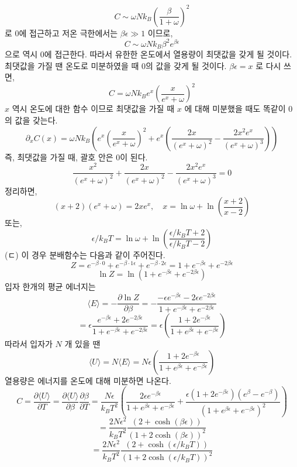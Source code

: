 \documentclass[a4paper,12pt]{report}
\begin{document}
	$$C\sim\omega Nk_B\left(\frac{\beta}{1+\omega} \right)^2 $$
	로 0에 접근하고 저온 극한에서는 $\beta \epsilon\gg 1$ 이므로,
	$$C\sim\omega Nk_B\beta^2e^{\beta\epsilon}$$
	으로 역시 0에 접근한다. 따라서 유한한 온도에서 열용량이 최댓값을 갖게 될 것이다. 최댓값을 가질 땐 온도로 미분하였을 때 0의 값을 갖게 될 것이다. $\beta\epsilon=x$ 로 다시 쓰면,
	$$C=\omega Nk_B e^{x}\left(\frac{x}{e^x+\omega} \right)^2 $$ 
	$x$ 역시 온도에 대한 함수 이므로 최댓값을 가질 때 $x$ 에 대해 미분했을 때도 똑같이 0의 값을 갖는다.
	$$\partial_x C(x)=\omega Nk_B\left(e^x\left( \frac{x}{e^x+\omega}\right)^2+e^x\left(\frac{2x}{(e^x+\omega)^2}-\frac{2x^2e^x}{(e^x+\omega)^3} \right)   \right) $$
	즉, 최댓값을 가질 때, 괄호 안은 0이 된다. 
	$$\frac{x^2}{(e^x+\omega)^2}+\frac{2x}{(e^x+\omega)^2}-\frac{2x^2e^x}{(e^x+\omega)^3}=0$$
	정리하면,
	$$(x+2)(e^x+\omega)=2xe^x,\quad x=\ln \omega+\ln\left(\frac{x+2}{x-2} \right) $$
	또는,
	$$\epsilon/k_BT=\ln \omega+\ln\left(\frac{\epsilon/k_BT+2}{\epsilon/k_BT-2} \right) $$
	(ㄷ) 이 경우 분배함수는 다음과 같이 주어진다. 
	$$Z=e^{-\beta\cdot0}+e^{-\beta\cdot1\epsilon}+e^{-\beta\cdot2\epsilon}=1+e^{-\beta\epsilon}+e^{-2\beta\epsilon}$$
	$$\ln Z=\ln (1+e^{-\beta\epsilon}+e^{-2\beta\epsilon})$$
	입자 한개의 평균 에너지는
	$$\langle E \rangle =-\frac{\partial \ln Z}{\partial \beta}=-\frac{-\epsilon e^{-\beta\epsilon}-2\epsilon e^{-2\beta\epsilon}}{1+e^{-\beta\epsilon}+e^{-2\beta\epsilon}}$$
	$$=\epsilon\frac{e^{-\beta\epsilon}+2e^{-2\beta\epsilon}}{1+e^{-\beta\epsilon}+e^{-2\beta\epsilon}}=\epsilon\left(\frac{1+2e^{-\beta\epsilon}}{1+e^{\beta\epsilon}+e^{-\beta\epsilon}} \right) $$
	따라서 입자가 $N$ 개 있을 땐
	$$\langle U\rangle =N\langle E\rangle =N\epsilon\left(\frac{1+2e^{-\beta\epsilon}}{1+e^{\beta\epsilon}+e^{-\beta\epsilon}} \right)$$
	열용량은 에너지를 온도에 대해 미분하면 나온다.
	$$C=\frac{\partial \langle U\rangle }{\partial T}=\frac{\partial \langle U\rangle }{\partial \beta}\frac{\partial \beta}{\partial T}=\frac{N\epsilon}{k_BT^2}\left(\frac{2\epsilon e^{-\beta\epsilon}}{1+e^{\beta\epsilon}+e^{-\beta\epsilon}} +\frac{\epsilon(1+2e^{-\beta\epsilon})(e^{\beta}-e^{-\beta})}{(1+e^{\beta\epsilon}+e^{-\beta\epsilon})^2} \right) $$
		$$=\frac{2N\epsilon^2}{k_BT^2}\frac{(2+\cosh(\beta\epsilon))}{(1+2\cosh(\beta\epsilon))^2}$$
	$$=\frac{2N\epsilon^2}{k_BT^2}\frac{(2+\cosh(\epsilon/k_BT))}{(1+2\cosh(\epsilon/k_BT))^2}$$
\end{document}
